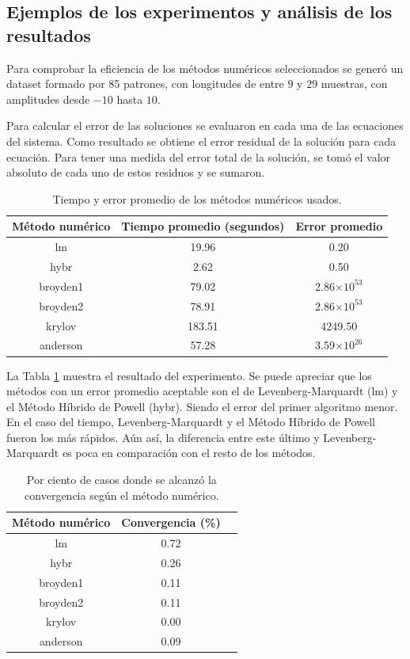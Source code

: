 \subsection{Ejemplos de los experimentos y análisis de los resultados}

Para comprobar la eficiencia de los métodos numéricos seleccionados se generó un dataset formado por 85 patrones, con longitudes de entre $9$ y 
$29$ muestras, con amplitudes desde $-10$ hasta $10$.

Para calcular el error de las soluciones se evaluaron en cada una de las ecuaciones del sistema. Como resultado
se obtiene el error residual de la solución para cada ecuación. Para tener una medida del error total
de la solución, se tomó el valor absoluto de cada uno de estos residuos y se sumaron.

\begin{table}
	\centering
	\caption{Tiempo y error promedio de los métodos numéricos usados.} \label{table:numerical-error}
	\begin{tabular}{|c|c|c|} \toprule
		Método numérico  & Tiempo promedio (segundos) & Error promedio \\ \midrule 
		lm & 19.96 & 0.20 \\ 
		hybr & 2.62 & 0.50 \\
		broyden1 & 79.02 & 2.86$\times 10^{53}$\\
		broyden2 & 78.91 & 2.86$\times 10^{53}$\\
		krylov & 183.51 & 4249.50 \\
		anderson & 57.28 & 3.59$\times 10^{26}$\\ \bottomrule
	\end{tabular}
\end{table}

La Tabla \ref{table:numerical-error} muestra el resultado del experimento. Se puede apreciar que los métodos 
con un error promedio aceptable son el de Levenberg-Marquardt (lm) y el Método Híbrido de Powell (hybr). 
Siendo el error del primer algoritmo menor.
En el caso del tiempo, Levenberg-Marquardt y el Método Híbrido de Powell fueron los más rápidos. Aún así, la
diferencia entre este último y Levenberg-Marquardt es poca en comparación con el resto de los métodos.

\begin{table}
	\centering
	\caption{Por ciento de casos donde se alcanzó la convergencia según el método numérico.} \label{table:numerical-convergence}
	\begin{tabular}{|c|c|c|} \toprule
		Método numérico & Convergencia (\%)\\ \midrule
		lm & 0.72 \\
		hybr & 0.26 \\
		broyden1 & 0.11 \\
		broyden2 & 0.11 \\
		krylov & 0.00 \\
		anderson & 0.09 \\ \bottomrule
	\end{tabular}
\end{table}

